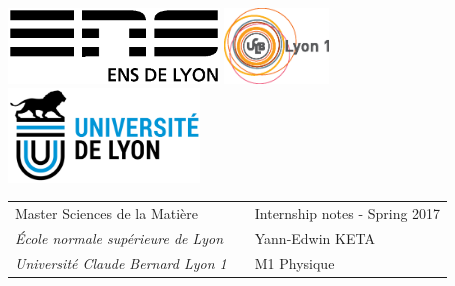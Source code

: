 \documentclass[class=report, float=false, crop=false]{standalone}
\begin{document}
\thispagestyle{empty}

\includegraphics[height=2cm]{logoens.eps} \hfill \includegraphics[height=2cm]{logoucbl.eps} \hfill \includegraphics[height=2.5cm]{udl-logo.png}

\vspace{0.5cm}

\begin{tabularx}{\textwidth}{ @{} l X l @{} }
{\sc Master Sciences de la Matière} & & Internship notes - Spring 2017 \\
{\it École normale supérieure de Lyon} & & Yann-Edwin KETA \\
{\it Université Claude Bernard Lyon 1} & & M1 Physique
\end{tabularx}
\end{document}
